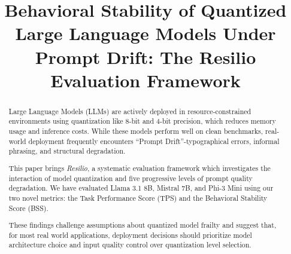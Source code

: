 \documentclass[conference]{IEEEtran}
\begin{document}
\title{Behavioral Stability of Quantized Large Language Models Under Prompt Drift: The Resilio Evaluation Framework}

\author{
\and
{}
\and
{}
\and
{}
}

\maketitle

\begin{abstract}
Large Language Models (LLMs) are actively deployed in resource-constrained environments using quantization like 8-bit and 4-bit precision, which reduces memory usage and inference costs. While these models perform well on clean benchmarks, real-world deployment frequently encounters ``Prompt Drift''-typographical errors, informal phrasing, and structural degradation.

This paper brings \textit{Resilio}, a systematic evaluation framework which investigates the interaction of model quantization and five progressive levels of prompt quality degradation. We have evaluated Llama 3.1 8B, Mistral 7B, and Phi-3 Mini using our two novel metrics: the Task Performance Score (TPS) and the Behavioral Stability Score (BSS).

These findings challenge assumptions about quantized model frailty and suggest that, for most real world applications, deployment decisions should prioritize model architecture choice and input quality control over quantization level selection.
\end{abstract}
\end{document}
